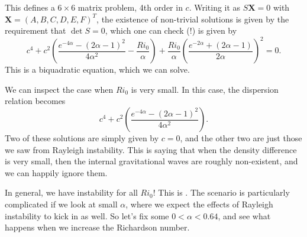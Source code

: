 \documentclass[a4paper]{article}
\begin{document}
This defines a $6 \times 6$ matrix problem, 4th order in $c$. Writing it as $S\mathbf{X} = 0$ with $\mathbf{X} = (A, B, C, D, E, F)^T$, the existence of non-trivial solutions is given by the requirement that $\det S = 0$, which one can check (!) is given by
\[
  c^4 + c^2 \left(\frac{e^{-4\alpha} - (2\alpha - 1)^2}{4\alpha^2} - \frac{Ri_0}{\alpha}\right) + \frac{Ri_0}{\alpha} \left(\frac{e^{-2\alpha} + (2\alpha - 1)}{2\alpha}\right)^2 = 0.
\]
This is a biquadratic equation, which we can solve.

We can inspect the case when $Ri_0$ is very small. In this case, the dispersion relation becomes
\[
  c^4 + c^2 \left(\frac{e^{-4\alpha} - (2\alpha - 1)^2}{4\alpha^2}\right).
\]
Two of these solutions are simply given by $c = 0$, and the other two are just those we saw from Rayleigh instability. This is saying that when the density difference is very small, then the internal gravitational waves are roughly non-existent, and we can happily ignore them.

In general, we have instability for all $Ri_0$! This is . The scenario is particularly complicated if we look at small $\alpha$, where we expect the effects of Rayleigh instability to kick in as well. So let's fix some $0 < \alpha < 0.64$, and see what happens when we increase the Richardson number. %
\end{document}
